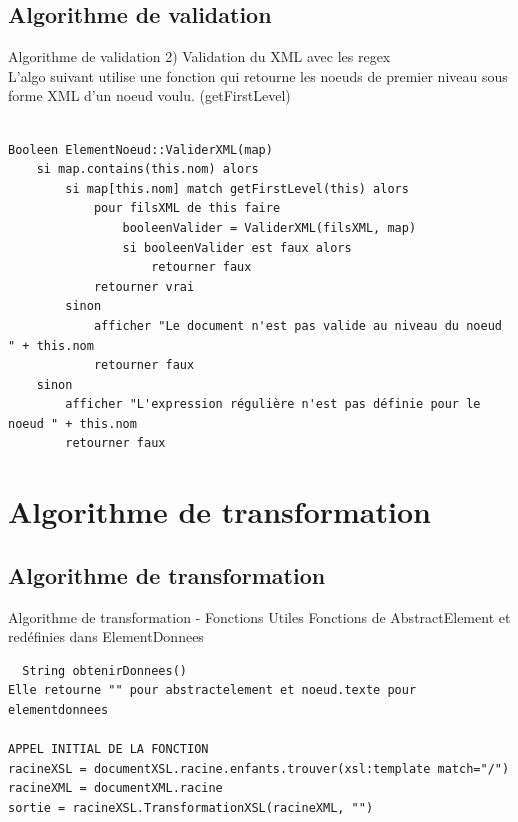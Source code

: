 \documentclass[aspectratio=169]{beamer}
\begin{document}
\subsection{Algorithme de  validation}
\begin{frame}[fragile]{Algorithme de validation}
	2) Validation du XML avec les regex\\[0.1cm]
	L'algo suivant utilise une fonction qui retourne les noeuds de premier
niveau sous forme XML d'un noeud voulu. (getFirstLevel)
	\scriptsize
	\begin{verbatim}

Booleen ElementNoeud::ValiderXML(map)
    si map.contains(this.nom) alors
        si map[this.nom] match getFirstLevel(this) alors
            pour filsXML de this faire
                booleenValider = ValiderXML(filsXML, map)
                si booleenValider est faux alors
                    retourner faux 
            retourner vrai
        sinon
            afficher "Le document n'est pas valide au niveau du noeud " + this.nom
            retourner faux
    sinon
        afficher "L'expression régulière n'est pas définie pour le noeud " + this.nom
        retourner faux
	\end{verbatim}
\end{frame}

\section{Algorithme de transformation}
 

\subsection{Algorithme de transformation}
\begin{frame}[fragile]{Algorithme de transformation - Fonctions Utiles }
 Fonctions de AbstractElement et redéfinies dans ElementDonnees
 \scriptsize
 \begin{verbatim}
  String obtenirDonnees()
Elle retourne "" pour abstractelement et noeud.texte pour elementdonnees

APPEL INITIAL DE LA FONCTION
racineXSL = documentXSL.racine.enfants.trouver(xsl:template match="/")
racineXML = documentXML.racine
sortie = racineXSL.TransformationXSL(racineXML, "")
 \end{verbatim}
\normalsize
\end{frame}
\end{document}
